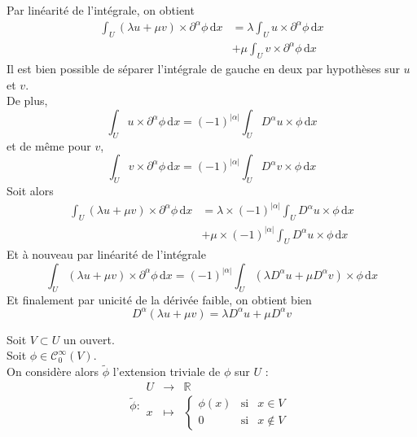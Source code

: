 \documentclass[../distribution.tex]{subfiles}
\begin{document}
{{\begin{mathlist}
				\item Par linéarité de l'intégrale, on obtient
					$$
						\begin{aligned}
							\int_{U} (\lambda u + \mu v) \times \partial^{\alpha} \phi \, \mathrm{d}x & = \lambda \int_{U} u \times \partial^{\alpha} \phi \, \mathrm{d}x \\
							& + \mu \int_{U} v \times \partial^{\alpha} \phi \, \mathrm{d}x
						\end{aligned}
					$$
					Il est bien possible de séparer l'intégrale de gauche en deux par hypothèses sur $u$ et $v$. \\
					De plus,
					$$
						\int_{U} u \times \partial^{\alpha} \phi \, \mathrm{d}x = (-1)^{|\alpha|} \int_{U} D^{\alpha} u \times \phi \, \mathrm{d}x
					$$
					et de même pour $v$,
					$$
						\int_{U} v \times \partial^{\alpha} \phi \, \mathrm{d}x = (-1)^{|\alpha|} \int_{U} D^{\alpha} v \times \phi \, \mathrm{d}x
					$$
					Soit alors
					$$
						\begin{aligned}
							\int_{U} (\lambda u + \mu v) \times \partial^{\alpha} \phi \, \mathrm{d}x & = \lambda \times (-1)^{|\alpha|} \int_{U} D^{\alpha} u \times \phi \, \mathrm{d}x \\
							& + \mu \times (-1)^{|\alpha|} \int_{U} D^{\alpha} u \times \phi \, \mathrm{d}x
						\end{aligned}
					$$
					Et à nouveau par linéarité de l'intégrale
					$$
						\int_{U} (\lambda u + \mu v) \times \partial^{\alpha} \phi \, \mathrm{d}x = (-1)^{|\alpha|} \int_{U} (\lambda D^{\alpha} u + \mu D^{\alpha} v) \times \phi \, \mathrm{d}x
					$$
					Et finalement par unicité de la dérivée faible, on obtient bien
					$$
						D^{\alpha}(\lambda u + \mu v) = \lambda D^{\alpha} u + \mu D^{\alpha} v
					$$
				\item Soit $V \subset U$ un ouvert. \\
					Soit $\phi \in \mathscr{C}_{0}^{\infty}(V)$. \\
					On considère alors $\tilde{\phi}$ l'extension \flqq{} triviale \frqq{} de $\phi$ sur $U$ :
					$$
						\tilde{\phi} :
						\begin{array}{rcl}
							U & \longrightarrow & \mathbb{R} \\
							x & \longmapsto &
							\left\{
								\begin{array}{rcl}
									\phi(x) & \text{si} & x \in V \\
									0 & \text{si} & x \notin V
								\end{array}
							\right.

\end{array}$$
\end{mathlist}}}
\end{document}
